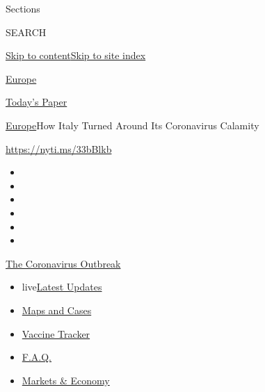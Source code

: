 Sections

SEARCH

\protect\hyperlink{site-content}{Skip to
content}\protect\hyperlink{site-index}{Skip to site index}

\href{https://www.nytimes.com/section/world/europe}{Europe}

\href{https://myaccount.nytimes.com/auth/login?response_type=cookie\&client_id=vi}{}

\href{https://www.nytimes.com/section/todayspaper}{Today's Paper}

\href{/section/world/europe}{Europe}\textbar{}How Italy Turned Around
Its Coronavirus Calamity

\href{https://nyti.ms/33bBlkb}{https://nyti.ms/33bBlkb}

\begin{itemize}
\item
\item
\item
\item
\item
\item
\end{itemize}

\href{https://www.nytimes.com/news-event/coronavirus?action=click\&pgtype=Article\&state=default\&region=TOP_BANNER\&context=storylines_menu}{The
Coronavirus Outbreak}

\begin{itemize}
\tightlist
\item
  live\href{https://www.nytimes.com/2020/08/08/world/coronavirus-updates.html?action=click\&pgtype=Article\&state=default\&region=TOP_BANNER\&context=storylines_menu}{Latest
  Updates}
\item
  \href{https://www.nytimes.com/interactive/2020/us/coronavirus-us-cases.html?action=click\&pgtype=Article\&state=default\&region=TOP_BANNER\&context=storylines_menu}{Maps
  and Cases}
\item
  \href{https://www.nytimes.com/interactive/2020/science/coronavirus-vaccine-tracker.html?action=click\&pgtype=Article\&state=default\&region=TOP_BANNER\&context=storylines_menu}{Vaccine
  Tracker}
\item
  \href{https://www.nytimes.com/interactive/2020/world/coronavirus-tips-advice.html?action=click\&pgtype=Article\&state=default\&region=TOP_BANNER\&context=storylines_menu}{F.A.Q.}
\item
  \href{https://www.nytimes.com/live/2020/08/07/business/stock-market-today-coronavirus?action=click\&pgtype=Article\&state=default\&region=TOP_BANNER\&context=storylines_menu}{Markets
  \& Economy}
\end{itemize}

